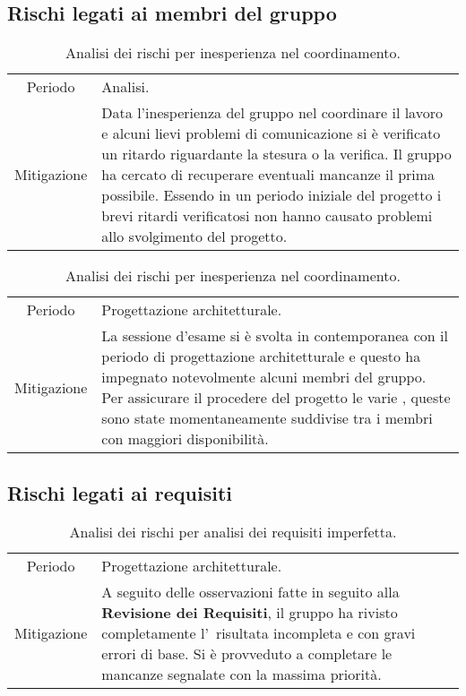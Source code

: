 \subsection{Rischi legati ai membri del gruppo}
\begin{table}[H]
	\centering
    \begin{tabular}{|c|p{11.5cm}|}
    \rowcolor{darkblue} \hline
    \multicolumn{2}{|c|}{\textcolor{white}{\textbf{RG3 - Inesperienza gestionale}}}\\ \hline
    Periodo & Analisi.\\ \hline
    Mitigazione & Data l'inesperienza del gruppo nel coordinare il lavoro e alcuni lievi problemi di comunicazione si è verificato un ritardo riguardante la stesura o la verifica. Il gruppo ha cercato di recuperare eventuali mancanze il prima possibile. Essendo in un periodo iniziale del progetto i brevi ritardi verificatosi non hanno causato problemi allo svolgimento del progetto.\\ \hline
    \end{tabular}
    \caption{\label{tab:ARG3}Analisi dei rischi per inesperienza nel coordinamento.}
\end{table}
\begin{table}[H]
	\centering
	\begin{tabular}{|c|p{11.5cm}|}
	\rowcolor{darkblue} \hline
	\multicolumn{2}{|c|}{\textcolor{white}{\textbf{RG2 - Disponibilità dei membri}}}\\ \hline
	Periodo & Progettazione architetturale.\\ \hline
	Mitigazione & La sessione d'esame si è svolta in contemporanea con il periodo di progettazione architetturale e questo ha impegnato notevolmente alcuni membri del gruppo. Per assicurare il procedere del progetto le varie \glo{attività}, queste sono state momentaneamente suddivise tra i membri con maggiori disponibilità.\\ \hline
	\end{tabular}
	\caption{\label{tab:ARG2}Analisi dei rischi per inesperienza nel coordinamento.}
\end{table}
\subsection{Rischi legati ai requisiti}
\begin{table}[H]
	\centering
	\begin{tabular}{|c|p{11.5cm}|}
		\rowcolor{darkblue} \hline
		\multicolumn{2}{|c|}{\textcolor{white}{\textbf{RR1 - Analisi dei requisiti imperfetta}}}\\ \hline
		Periodo & Progettazione architetturale.\\ \hline
		Mitigazione & A seguito delle osservazioni fatte in seguito alla \textbf{Revisione dei Requisiti}, il gruppo {\Gruppo} ha rivisto completamente l'\AdR\ risultata incompleta e con gravi errori di base. Si è provveduto a completare le mancanze segnalate con la massima priorità.\\ \hline
	\end{tabular}
	\caption{\label{tab:ARR1}Analisi dei rischi per analisi dei requisiti imperfetta.}
\end{table}